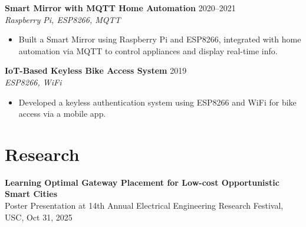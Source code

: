 \documentclass[letterpaper,10pt]{article}
\begin{document}
\textbf{Smart Mirror with MQTT Home Automation} \hfill 2020--2021 \\
\textit{Raspberry Pi, ESP8266, MQTT}
\begin{itemize} \itemsep -2pt
    \item Built a Smart Mirror using Raspberry Pi and ESP8266, integrated with home automation via MQTT to control appliances and display real-time info.
\end{itemize}

\textbf{IoT-Based Keyless Bike Access System} \hfill 2019 \\
\textit{ESP8266, WiFi}
\begin{itemize} \itemsep -2pt
    \item Developed a keyless authentication system using ESP8266 and WiFi for bike access via a mobile app.
\end{itemize}

\section*{Research}
\textbf{Learning Optimal Gateway Placement for Low-cost Opportunistic Smart Cities} \\
Poster Presentation at 14th Annual Electrical Engineering Research Festival, USC, Oct 31, 2025
\end{document}
